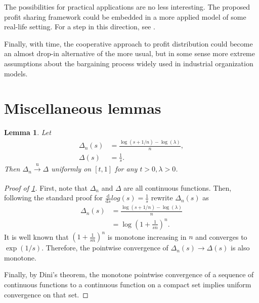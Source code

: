 \documentclass[a4paper]{article}
\newtheorem{lemma}{Lemma}
\begin{document}
The possibilities for practical applications are no less interesting.
The proposed profit sharing framework could be embedded in a more applied model of some real-life setting.
For a step in this direction, see \textcite{stancsics2023hybrid}.

Finally, with time, the cooperative approach to profit distribution could become an almost drop-in alternative of the more usual, but in some sense more extreme assumptions about the bargaining process widely used in industrial organization models.


\appendix

\printbibliography

\section{Miscellaneous lemmas}

\begin{lemma}
    \label{lemma:log_convergence}
    Let 
    \begin{align*}
        \Delta_n(s) &= \frac{\log(s + 1/n) - \log(\lambda)}{n}, \\
        \Delta(s) &= \frac{1}{s}.
    \end{align*}
    Then $\Delta_n \xrightarrow[]{\mathrm{u}} \Delta$ uniformly on $[t, 1]$ for any $t > 0, \lambda > 0$.
\end{lemma}
\begin{proof}[Proof of \cref{lemma:log_convergence}]
    First, note that $\Delta_n$ and $\Delta$ are all continuous functions.
    Then, following the standard proof for $\frac{\mathrm{d}}{\mathrm{d}s}log(s) = \frac{1}{s}$ rewrite $\Delta_n(s)$ as
    \begin{align*}
        \Delta_n(s) &= \frac{\log(s + 1/n) - \log(\lambda)}{n} \\
        &= \log \left( 1 + \frac{1}{sn} \right) ^ n .
    \end{align*}
    It is well known that $\left( 1 + \frac{1}{sn} \right) ^ n$ is monotone increasing in $n$ and converges to $\exp (1/s)$.
    Therefore, the pointwise convergence of $\Delta_n(s) \to \Delta(s)$ is also monotone.

    Finally, by Dini's theorem, the monotone pointwise convergence of a sequence of continuous functions to a continuous function on a compact set implies uniform convergence on that set.
\end{proof}
\end{document}
